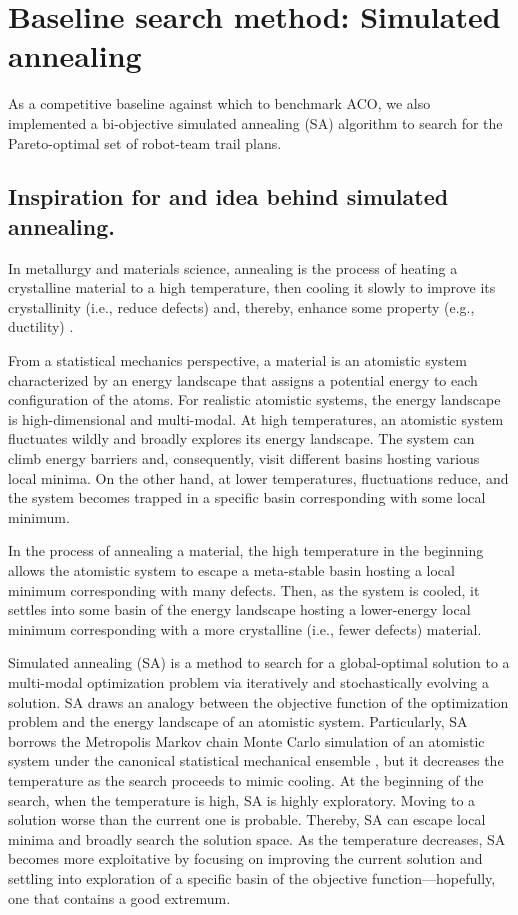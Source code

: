 \documentclass[fleqn,10pt,lineno]{wlpeerj}
\begin{document}
\section{Baseline search method: Simulated annealing}
As a competitive baseline against which to benchmark ACO, we also implemented a bi-objective simulated annealing (SA) algorithm \cite{kirkpatrick1983optimization,simon2013evolutionary,zomaya2010simulated} to search for the Pareto-optimal set of robot-team trail plans.

\subsection{Inspiration for and idea behind simulated annealing.}
In metallurgy and materials science, annealing is the process of heating a crystalline material to a high temperature, then cooling it slowly to improve its crystallinity (i.e., reduce defects) and, thereby, enhance some property (e.g., ductility) \cite{callister2020materials}.

From a statistical mechanics \cite{chandler1987introduction} perspective, a material is an atomistic system characterized by an energy landscape that assigns a potential energy to each configuration of the atoms. For realistic atomistic systems, the energy landscape is high-dimensional and multi-modal. At high temperatures, an atomistic system fluctuates wildly and broadly explores its energy landscape. The system can climb energy barriers and, consequently, visit different basins hosting various local minima.
On the other hand, at lower temperatures, fluctuations reduce, and the system becomes trapped in a specific basin corresponding with some local minimum.

In the process of annealing a material, the high temperature in the beginning allows the atomistic system to escape a meta-stable basin hosting a local minimum corresponding with many defects. 
Then, as the system is cooled, it settles into some basin of the energy landscape hosting a lower-energy local minimum corresponding with a more crystalline (i.e., fewer defects) material.
  
Simulated annealing (SA) \cite{kirkpatrick1983optimization,simon2013evolutionary,zomaya2010simulated} is a method to search for a global-optimal solution to a multi-modal optimization problem via iteratively and stochastically evolving a solution.
SA draws an analogy between the objective function of the optimization problem and the energy landscape of an atomistic system. 
Particularly, SA borrows the Metropolis Markov chain Monte Carlo simulation of an atomistic system under the canonical statistical mechanical ensemble \cite{frenkel2023understanding}, but it decreases the temperature as the search proceeds to mimic cooling. 
   At the beginning of the search, when the temperature is high, SA is highly exploratory. Moving to a solution worse than the current one is probable.
   Thereby, SA can escape local minima and broadly search the solution space.
  As the temperature decreases, SA becomes more exploitative by focusing on improving the current solution and settling into exploration of a specific basin of the objective function---hopefully, one that contains a good extremum. 
 
\end{document}
